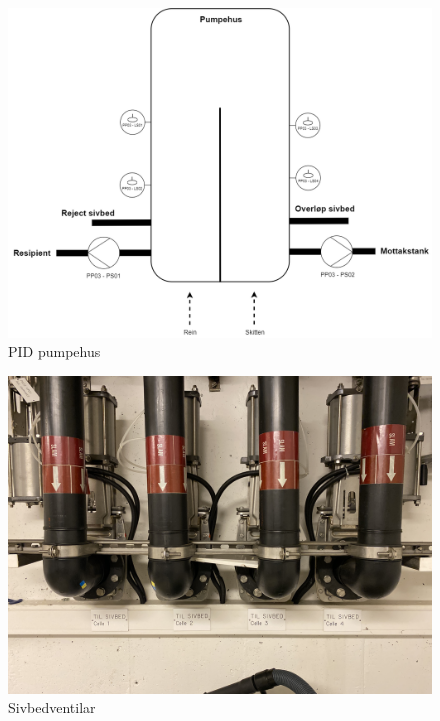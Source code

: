 \begin{figure}[htbp]
    \centering
    \includegraphics[width=1\textwidth]{Figurar/Pumpehus.drawio.png}
    \caption{\gls{PID} pumpehus}\label{fig:Pumpehus}
\end{figure}

\begin{figure}[htbp]
    \centering
    \includegraphics[width=1\textwidth]{Bilder/SivbedSande.jpg}
    \caption{Sivbedventilar}\label{fig:SivbedVentilar}
\end{figure}

\newpage



